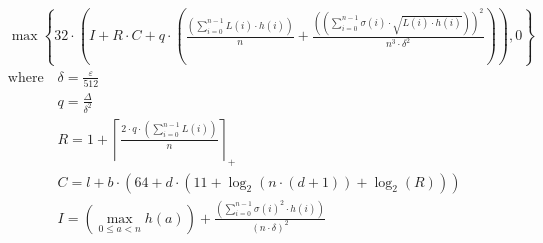 \[\begin{aligned} &\max\left\{ 32 \cdot \left(I + R \cdot C + q \cdot \left(\frac{\left(\sum_{i=0}^{n-1} L\left(i\right) \cdot h\left(i\right)\right)}{n} + \frac{\left(\left(\sum_{i=0}^{n-1} \sigma\left(i\right) \cdot \sqrt{L\left(i\right) \cdot h\left(i\right)}\right)\right)^{2}}{n^{3} \cdot \delta^{2}}\right)\right), 0 \right\} \\ &\text{where}\quad \delta = \frac{\varepsilon}{512} \\ &\phantom{\text{where}\quad} q = \frac{\Delta}{\delta^{2}} \\ &\phantom{\text{where}\quad} R = 1 + \left\lceil \frac{2 \cdot q \cdot \left(\sum_{i=0}^{n-1} L\left(i\right)\right)}{n} \right\rceil_{+} \\ &\phantom{\text{where}\quad} C = l + b \cdot \left(64 + d \cdot \left(11 + \log_{2}\left(n \cdot \left(d + 1\right)\right) + \log_{2}\left(R\right)\right)\right) \\ &\phantom{\text{where}\quad} I = \left(\max_{0\le a<n} h\left(a\right)\right) + \frac{\left(\sum_{i=0}^{n-1} \sigma\left(i\right)^{2} \cdot h\left(i\right)\right)}{\left(n \cdot \delta\right)^{2}}\end{aligned}\]
